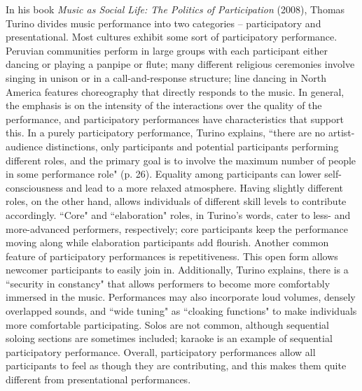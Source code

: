 In his book \textit{Music as Social Life: The Politics of Participation} (2008), Thomas Turino divides music performance into two categories -- participatory and presentational. Most cultures exhibit some sort of participatory performance. Peruvian communities perform in large groups with each participant either dancing or playing a panpipe or flute; many different religious ceremonies involve singing in unison or in a call-and-response structure; line dancing in North America features choreography that directly responds to the music. In general, the emphasis is on the intensity of the interactions over the quality of the performance, and participatory performances have characteristics that support this. In a purely participatory performance, Turino explains, ``there are no artist-audience distinctions, only participants and potential participants performing different roles, and the primary goal is to involve the maximum number of people in some performance role" (p. 26). Equality among participants can lower self-consciousness and lead to a more relaxed atmosphere. Having slightly different roles, on the other hand, allows individuals of different skill levels to contribute accordingly. ``Core" and ``elaboration" roles, in Turino's words, cater to less- and more-advanced performers, respectively; core participants keep the performance moving along while elaboration participants add flourish. Another common feature of participatory performances is repetitiveness. This open form allows newcomer participants to easily join in. Additionally, Turino explains, there is a ``security in constancy" that allows performers to become more comfortably immersed in the music. Performances may also incorporate loud volumes, densely overlapped sounds, and ``wide tuning" as ``cloaking functions" to make individuals more comfortable participating. Solos are not common, although sequential soloing sections are sometimes included; karaoke is an example of sequential participatory performance. Overall, participatory performances allow all participants to feel as though they are contributing, and this makes them quite different from presentational performances.
